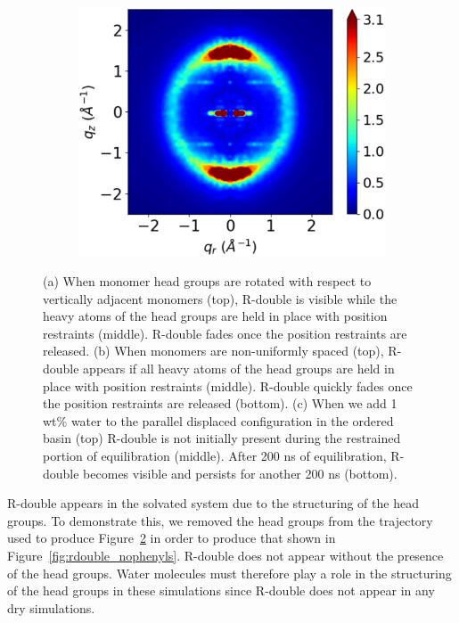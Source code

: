 \documentclass[journal=jpcbfk,manuscript=article]{achemso}
\begin{document}
\begin{figure}[!htb]
\begin{subfigure}{0.325\linewidth}
  	\caption{}\label{fig:staggered_rzplot_norestraints} 
  \end{subfigure}
  \begin{subfigure}{0.325\linewidth}
  	\centering
  	\includegraphics[width=\textwidth]{solvated_offset_rzplot_1.pdf}
  	\caption{}\label{fig:solvated_pore_rzplot_norestraints}
  \end{subfigure}
  \caption{(a) When monomer head groups are rotated with respect to vertically
	  adjacent monomers (top), R-double is visible while the heavy atoms of the head
	  groups are held in place with position restraints (middle). R-double
	  fades once the position restraints are released. (b) When monomers are
	  non-uniformly spaced (top), R-double appears if all heavy atoms of the head
	  groups are held in place with position restraints (middle). R-double quickly
	  fades once the position restraints are released (bottom). (c) When we add 1
	  wt\% water to the parallel displaced configuration in the ordered basin (top)
	  R-double is not initially present during the restrained portion of
	  equilibration (middle).  After 200 ns of equilibration, R-double becomes
	  visible and persists for another 200 ns (bottom).}\label{fig:rdouble}
  \end{figure}

  R-double appears in the solvated system due to the structuring of the head
  groups. To demonstrate this, we removed the head groups from the trajectory
  used to produce Figure~\ref{fig:solvated_pore_rzplot_norestraints} in order to
  produce that shown in Figure~\ref{fig:rdouble_nophenyls}. R-double does not
  appear without the presence of the head groups. Water molecules must therefore
  play a role in the structuring of the head groups in these simulations since
  R-double does not appear in any dry simulations.
\end{document}
